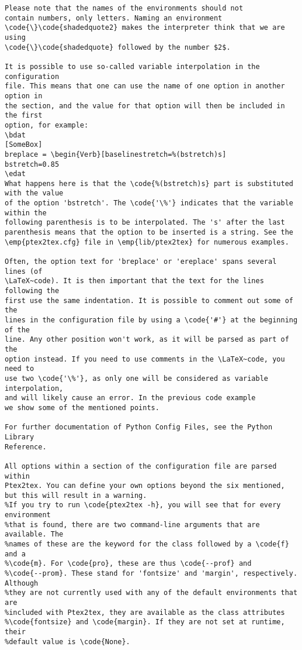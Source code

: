 \documentclass[a4paper,11pt]{article}
\begin{document}
{{{{{{{{{{{\begin{Verbatim}
Please note that the names of the environments should not
contain numbers, only letters. Naming an environment
\code{\}\code{shadedquote2} makes the interpreter think that we are using
\code{\}\code{shadedquote} followed by the number $2$.

It is possible to use so-called variable interpolation in the configuration
file. This means that one can use the name of one option in another option in
the section, and the value for that option will then be included in the first
option, for example:
\bdat
[SomeBox]
breplace = \begin{Verb}[baselinestretch=%(bstretch)s]
bstretch=0.85
\edat
What happens here is that the \code{%(bstretch)s} part is substituted with the value
of the option 'bstretch'. The \code{'\%'} indicates that the variable within the
following parenthesis is to be interpolated. The 's' after the last
parenthesis means that the option to be inserted is a string. See the
\emp{ptex2tex.cfg} file in \emp{lib/ptex2tex} for numerous examples.

Often, the option text for 'breplace' or 'ereplace' spans several lines (of
\LaTeX~code). It is then important that the text for the lines following the
first use the same indentation. It is possible to comment out some of the
lines in the configuration file by using a \code{'#'} at the beginning of the
line. Any other position won't work, as it will be parsed as part of the
option instead. If you need to use comments in the \LaTeX~code, you need to
use two \code{'\%'}, as only one will be considered as variable interpolation,
and will likely cause an error. In the previous code example
we show some of the mentioned points.

For further documentation of Python Config Files, see the Python Library
Reference.

All options within a section of the configuration file are parsed within
Ptex2tex. You can define your own options beyond the six mentioned,
but this will result in a warning.
%If you try to run \code{ptex2tex -h}, you will see that for every environment
%that is found, there are two command-line arguments that are available. The
%names of these are the keyword for the class followed by a \code{f} and a
%\code{m}. For \code{pro}, these are thus \code{--prof} and
%\code{--prom}. These stand for 'fontsize' and 'margin', respectively. Although
%they are not currently used with any of the default environments that are
%included with Ptex2tex, they are available as the class attributes
%\code{fontsize} and \code{margin}. If they are not set at runtime, their
%default value is \code{None}.


\end{Verbatim}}}}}}}}}}}}
\end{document}
